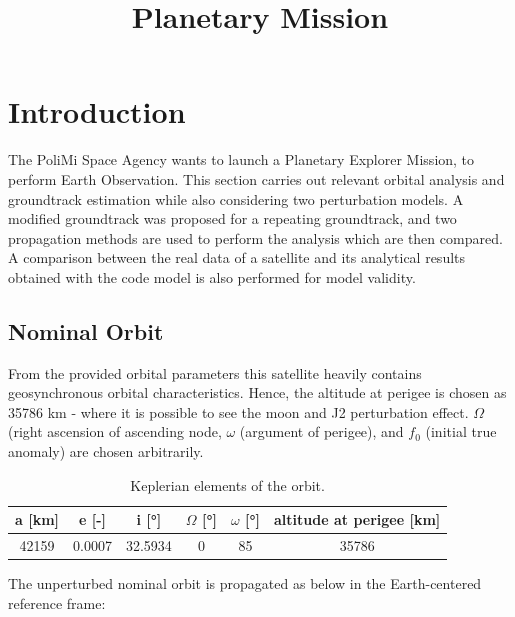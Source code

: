 \documentclass{article}
\title{Planetary Mission}
\begin{document}
	
	
\section{Introduction}
The  PoliMi  Space  Agency  wants  to  launch  a  Planetary  Explorer  Mission,  to  perform  Earth Observation. This section carries out relevant orbital analysis and groundtrack estimation while also considering two perturbation models. A modified groundtrack was proposed for a repeating groundtrack, and two propagation methods are used to perform the analysis which are then compared. A comparison between the real data of a satellite and its analytical results obtained with the code model is also performed for model validity. 

\subsection{Nominal Orbit}

From the provided orbital parameters this satellite heavily contains geosynchronous orbital characteristics. Hence, the altitude at perigee is chosen as 35786 km - where it is possible to see the moon and J2 perturbation effect. $\Omega$ (right ascension of ascending node, $\omega$ (argument of perigee), and $f_0$ (initial true anomaly) are chosen arbitrarily.


\begin{table}[ht]
	\centering
	\label{tab:keplerian_elements}
	\begin{tabular}{|c|c|c|c|c|c|}
		\hline
		a [km] & e [-] & i [°] & $\Omega$ [°] & $\omega$ [°] & altitude at perigee [km] \\
		\hline
		42159 & 0.0007 & 32.5934 & 0 & 85 & 35786 \\
		\hline
	\end{tabular}
	\caption{Keplerian elements of the orbit.}
	\label{tab:keplerian_elements}
\end{table}

The unperturbed nominal orbit is propagated as below in the Earth-centered reference frame:
\end{document}
